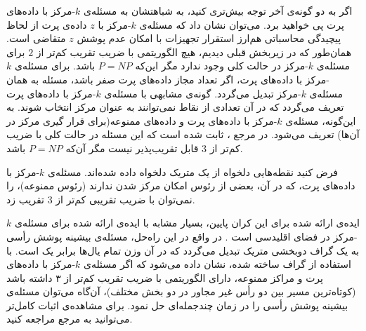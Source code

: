 





اگر به دو گونه‌ی آخر توجه بیش‌تری کنید، به شباهتشان به مسئله‌ی $k$-مرکز با داده‌های پرت پی خواهید برد. می‌توان نشان داد که مسئله‌ی $k$-مرکز با $z$ داده‌ی پرت از لحاظ پیچیدگی محاسباتی هم‌ارز استقرار تجهیزات با امکان عدم پوشش‌ $z$ متقاضی است. همان‌طور که در زیربخش قبلی دیدیم، هیچ الگوریتمی با ضریب تقریب کم‌تر از $2$ برای مسئله‌ی $k$-مرکز در حالت کلی وجود ندارد مگر این‌که $P = NP$ باشد. برای مسئله‌ی $k$-مرکز با داده‌های پرت، اگر تعداد مجاز داده‌های پرت صفر باشد، مسئله به همان مسئله‌ی $k$-مرکز تبدیل می‌گردد. گونه‌ی مشابهی با مسئله‌ی $k$-مرکز با داده‌های پرت تعریف می‌گردد که در آن تعدادی از نقاط نمی‌توانند به عنوان مرکز انتخاب شوند. به این‌گونه، مسئله‌ی $k$-مرکز با داده‌های پرت و داده‌های ممنوعه(برای قرار گیری مرکز در آن‌ها) تعریف می‌شود. در مرجع ، ثابت شده است  که این مسئله در حالت کلی با ضریب کم‌تر از $3$ قابل تقریب‌پذیر نیست مگر آن‌که $P = NP$ باشد. 


فرض کنید نقطه‌هایی دلخواه از یک متریک دلخواه داده شده‌اند. مسئله‌ی $k$-مرکز با داده‌های پرت، که در آن، بعضی از رئوس امکان مرکز شدن ندارند (رئوس ممنوعه)، را نمی‌توان با ضریب تقریبی کم‌تر از $3$ تقریب زد.


ایده‌ی ارائه شده برای این کران پایین، بسیار مشابه با ایده‌ی ارائه شده برای مسئله‌ی $k$-مرکز در فضای اقلیدسی است . در واقع در این راه‌حل، مسئله‌ی بیشینه پوشش رأسی به یک گراف دوبخشی متریک تبدیل می‌گردد که در آن وزن تمام یال‌ها برابر یک است. با استفاده از گراف ساخته شده، نشان داده می‌شود که اگر مسئله‌ی $k$-مرکز با داده‌های پرت و مراکز ممنوعه، دارای الگوریتمی با ضریب تقریب کم‌تر از ۳ داشته باشد (کوتاه‌ترین مسیر بین دو رأس غیر مجاور در دو بخش مختلف)، آن‌گاه می‌توان مسئله‌ی بیشینه پوشش رأسی را در زمان چندجمله‌ای حل نمود. برای مشاهده‌ی اثبات کامل‌تر می‌توانید به مرجع  مراجعه کنید.

